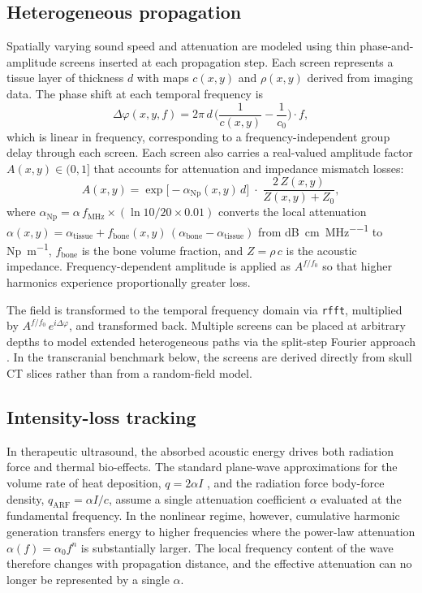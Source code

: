 \documentclass[11pt]{article}
\begin{document}
\subsection{Heterogeneous propagation}

Spatially varying sound speed and attenuation are modeled using thin
phase-and-amplitude screens inserted at each propagation step.  Each
screen represents a tissue layer of thickness $d$ with maps $c(x,y)$
and $\rho(x,y)$ derived from imaging data.  The phase shift at each
temporal frequency is
\begin{equation}
  \Delta\varphi(x,y,f) = 2\pi\,d\,
  \biggl(\frac{1}{c(x,y)} - \frac{1}{c_0}\biggr) \cdot f,
  \label{eq:phase_screen}
\end{equation}
which is linear in frequency, corresponding to a
frequency-independent group delay through each screen.
Each screen also carries a real-valued amplitude factor
$A(x,y) \in (0,1]$ that accounts for attenuation and impedance
mismatch losses:
\begin{equation}
  A(x,y) = \exp\!\bigl[-\alpha_{\mathrm{Np}}(x,y)\,d\bigr]
  \;\cdot\;
  \frac{2\,Z(x,y)}{Z(x,y) + Z_0},
  \label{eq:amplitude_screen}
\end{equation}
where $\alpha_{\mathrm{Np}} = \alpha\,f_{\mathrm{MHz}} \times
({\ln 10}/{20 \times 0.01})$ converts the local attenuation
$\alpha(x,y) = \alpha_{\mathrm{tissue}} + f_{\mathrm{bone}}(x,y)\,
(\alpha_{\mathrm{bone}} - \alpha_{\mathrm{tissue}})$ from
\si{\dB\per\cm\per\MHz} to \si{Np\per\m}, $f_{\mathrm{bone}}$ is the
bone volume fraction, and $Z = \rho\,c$ is the acoustic impedance.
Frequency-dependent amplitude is applied as $A^{f/f_0}$ so that higher
harmonics experience proportionally greater loss.

The field is transformed to the temporal frequency domain via
\texttt{rfft}, multiplied by $A^{f/f_0}\,e^{i\Delta\varphi}$, and
transformed back.  Multiple screens can be placed at arbitrary depths
to model extended heterogeneous paths via the split-step Fourier
approach \cite{martin1988}.  In the transcranial benchmark below, the
screens are derived directly from skull CT slices rather than from a
random-field model.

\subsection{Intensity-loss tracking}

In therapeutic ultrasound, the absorbed acoustic energy drives both
radiation force and thermal bio-effects.  The standard plane-wave
approximations for the volume rate of heat deposition,
$q = 2\alpha I$ \cite{nyborg1981}, and the radiation force body-force
density, $q_{\mathrm{ARF}} = \alpha I / c$, assume a single
attenuation coefficient $\alpha$ evaluated at the fundamental
frequency.  In the nonlinear regime, however, cumulative harmonic
generation transfers energy to higher frequencies where the
power-law attenuation $\alpha(f) = \alpha_0 f^n$ is substantially
larger.  The local frequency content of the wave therefore changes
with propagation distance, and the effective attenuation can no
longer be represented by a single $\alpha$.
\end{document}
